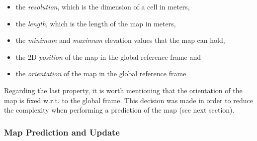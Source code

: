 \begin{itemize}
    \item the \textit{resolution}, which is the dimension of a cell in meters,
    \item the \textit{length}, which is the length of the map in meters,
    \item the \textit{minimum} and \textit{maximum} elevation values that
        the map can hold,
    \item the 2D \textit{position} of the map in the global reference frame and
    \item the \textit{orientation} of the map in the global reference frame
\end{itemize}

Regarding the last property, it is worth mentioning that the orientation
of the map is fixed w.r.t. to the global frame.
This decision was made in order to reduce the complexity when performing
a prediction of the map (see next section).

\subsubsection{Map Prediction and Update} \label{map_prediction_and_update}

